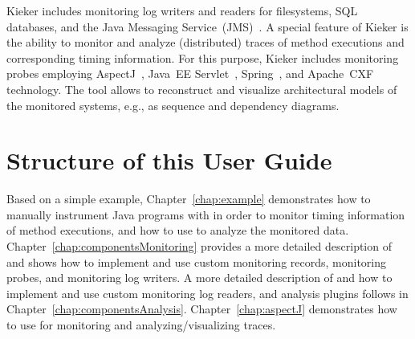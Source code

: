 
Kieker includes monitoring log writers and readers for filesystems, SQL %
databases, and the Java Messaging Service~(JMS)~\cite{JMS-WebSite}. %
A special feature of Kieker is the ability to monitor and analyze (distributed) %
traces of method executions and corresponding timing information. %
For this purpose, Kieker includes monitoring probes employing %
AspectJ~\cite{AspectJ-WebSite}, %
Java~EE Servlet~\cite{JavaServletTechnology-WebSite}, %
Spring~\cite{Spring-WebSite}, and %
Apache~CXF~\cite{CXF-WebSite} technology. %
The \KiekerTraceAnalysis{} tool allows to reconstruct and visualize %
architectural models of the monitored systems, e.g., as sequence and %
dependency diagrams.

\section{Structure of this User Guide}

Based on a simple example, Chapter~\ref{chap:example} demonstrates %
how to manually instrument Java programs with \KiekerMonitoringPart{} %
in order to monitor timing information of method executions, and %
how to use \KiekerAnalysisPart{} to analyze the monitored data. %
Chapter~\ref{chap:componentsMonitoring} provides a more detailed %
description of \KiekerMonitoringPart{} and shows how to implement and %
use custom monitoring records, monitoring probes, and monitoring log writers. %
A more detailed description of \KiekerAnalysisPart{} and how to implement and use %
custom monitoring log readers, and analysis plugins follows in %
Chapter~\ref{chap:componentsAnalysis}. %
Chapter~\ref{chap:aspectJ} demonstrates how to use \KiekerTraceAnalysis{} %
for monitoring and analyzing/visualizing traces. %

\quad\\


